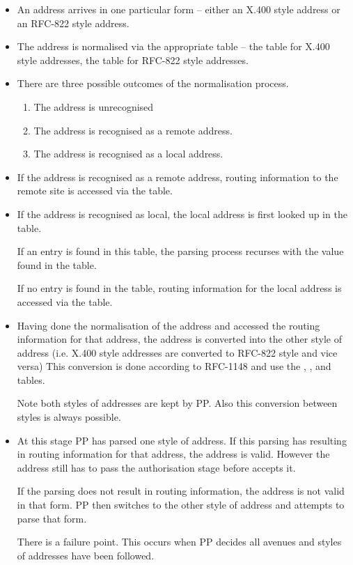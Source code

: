 \begin{itemize}

\item	An address arrives in one particular form -- either an X.400
style address or an RFC-822 style address.

\item	The address is normalised via the appropriate table -- the
 table for X.400 style addresses, the  table for
RFC-822 style addresses.

\item	There are three possible outcomes of the normalisation
process.

\begin{enumerate}
\item	The address is unrecognised
\item	The address is recognised as a remote address.
\item	The address is recognised as a local address.
\end{enumerate}

\item 	If the address is recognised as a remote address, routing
information to the remote site is accessed via the 
table.

\item	If the address is recognised as local, the local address is
first looked up in the  table. 

If an entry is found in
this table, the parsing process recurses with the value found in the
 table. 

If no entry is found in the  table, routing information
for the local address is accessed via the  table.

\item	Having done the normalisation of the address and accessed the
routing information for that address, the address is converted into
the other style of address (i.e. X.400 style addresses are converted to
RFC-822 style and vice versa) This conversion is done according to
RFC-1148 and use the , , and
 tables.

Note both styles of addresses are kept by PP. Also this conversion
between styles is always possible.

\item	At this stage PP has parsed one style of address. If this
parsing has resulting in routing information for that address, the
address is valid. However the address
still has to pass the authorisation stage before  accepts it.

If the parsing does not result in routing information, the address
is not valid in that form. PP then switches to the other style of
address and attempts to parse that form.

There is a failure point. This occurs when PP decides all avenues and
styles of addresses have been followed.
\end{itemize}

